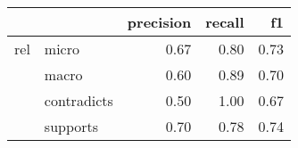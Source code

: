 \begin{tabular}{llrrr}
\toprule
    &          &  precision &  recall &   f1 \\
\midrule
rel & micro &       0.67 &    0.80 & 0.73 \\
    & macro &       0.60 &    0.89 & 0.70 \\
    & contradicts &       0.50 &    1.00 & 0.67 \\
    & supports &       0.70 &    0.78 & 0.74 \\
\bottomrule
\end{tabular}
